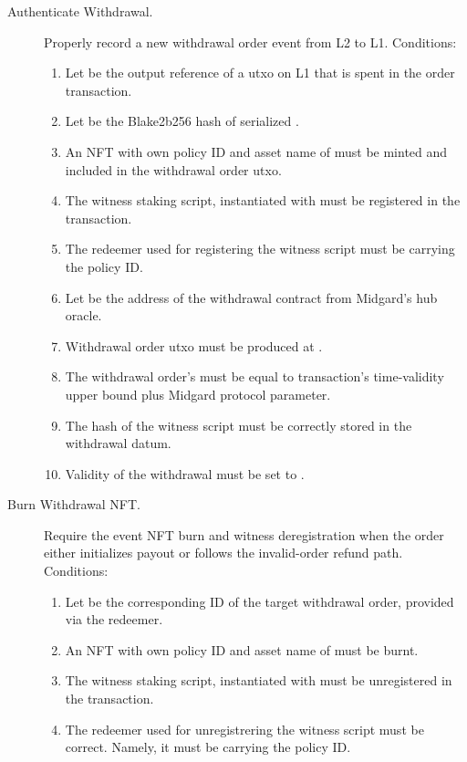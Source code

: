 \documentclass[../midgard.tex]{subfiles}
\begin{document}
\begin{description}
  \item[Authenticate Withdrawal.] Properly record a new withdrawal order event from L2 to L1.
    Conditions:
      \begin{enumerate}
        \item Let  be the output reference of a utxo on L1 that is spent in the order transaction.
        \item Let  be the Blake2b256 hash of serialized .
        \item An NFT with own policy ID and asset name of  must be minted and included in the withdrawal order utxo.
        \item The witness staking script, instantiated with  must be registered in the transaction.
        \item The redeemer used for registering the witness script must be  carrying the  policy ID.
        \item Let  be the address of the withdrawal contract from Midgard's hub oracle.
        \item Withdrawal order utxo must be produced at .
        \item The withdrawal order's  must be equal to transaction's time-validity upper bound plus  Midgard protocol parameter.
        \item The hash of the witness script must be correctly stored in the withdrawal datum.
        \item Validity of the withdrawal must be set to .
      \end{enumerate}
    \item[Burn Withdrawal NFT.] Require the event NFT burn and witness deregistration when the order either initializes payout or follows the invalid-order refund path.
    Conditions:
      \begin{enumerate}
        \item Let  be the corresponding ID of the target withdrawal order, provided via the redeemer.
        \item An NFT with own policy ID and asset name of  must be burnt.
        \item The witness staking script, instantiated with  must be unregistered in the transaction.
        \item The redeemer used for unregistrering the witness script must be correct. Namely, it must be  carrying the  policy ID.
      \end{enumerate}
\end{description}
\end{document}
